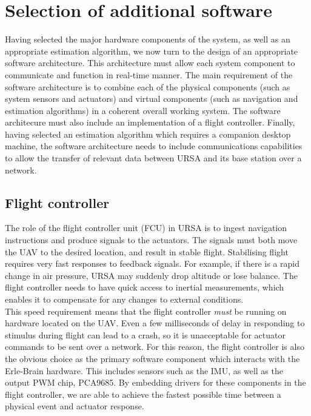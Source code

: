 \documentclass[capstone_report.tex]{subfiles}
\begin{document}
 \section{Selection of additional software}
    Having selected the major hardware components of the system, as well as an appropriate estimation algorithm, we now turn to the design of an appropriate software architecture. This architecture must allow each system component to communicate and function in real-time manner. The main requirement of the software architecture is to combine each of the physical components (such as system sensors and actuators) and virtual components (such as navigation and estimation algorithms) in a coherent overall working system. The software architecure must also include an implementation of a flight controller. Finally, having selected an estimation algorithm which requires a companion desktop machine, the software architecture needs to include communications capabilities to allow the transfer of relevant data between URSA and its base station over a network.\\

    \subsection{Flight controller}
    The role of the flight controller unit (FCU) in URSA is to ingest navigation instructions and produce signals to the actuators. The signals must both move the UAV to the desired location, and result in stable flight. Stabilising flight requires very fast responses to feedback signals. For example, if there is a rapid change in air pressure, URSA may suddenly drop altitude or lose balance. The flight controller needs to have quick access to inertial measurements, which enables it to compensate for any changes to external conditions. \\

    This speed requirement means that the flight controller \emph{must} be running on hardware located on the UAV. Even a few milliseconds of delay in responding to stimulus during flight can lead to a crash, so it is unacceptable for actuator commands to be sent over a network. For this reason, the flight controller is also the obvious choice as the primary software component which interacts with the Erle-Brain hardware. This includes sensors such as the IMU, as well as the output PWM chip, PCA9685. By embedding drivers for these components in the flight controller, we are able to achieve the fastest possible time between a physical event and actuator response. \\
\end{document}
